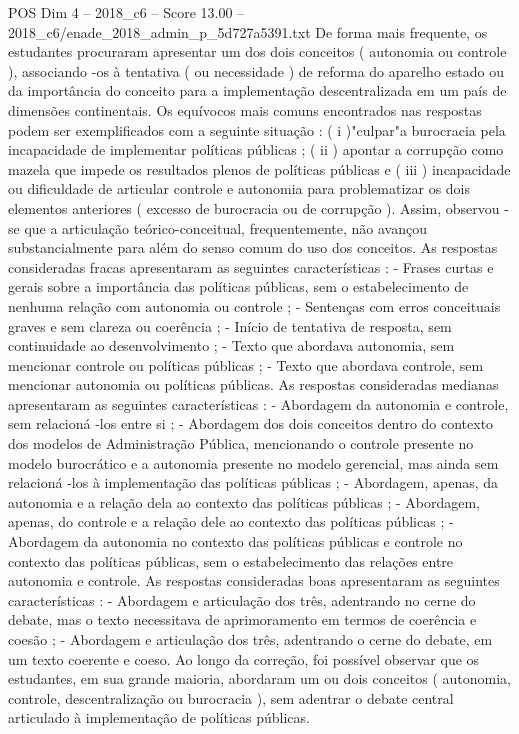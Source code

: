 \begin{textsample}{POS Dim 4 – 2018\_c6 – Score 13.00 – 2018\_c6/enade\_2018\_admin\_p\_5d727a5391.txt}
De forma mais frequente, os estudantes procuraram apresentar um dos dois conceitos ( autonomia ou controle ), associando -os à tentativa ( ou necessidade ) de reforma do aparelho estado ou da importância do conceito para a implementação descentralizada em um país de dimensões continentais.
Os equívocos mais comuns encontrados nas respostas podem ser exemplificados com a seguinte situação : ( i )"culpar"a burocracia pela incapacidade de implementar políticas públicas ; ( ii ) apontar a corrupção como mazela que impede os resultados plenos de políticas públicas e ( iii ) incapacidade ou dificuldade de articular controle e autonomia para problematizar os dois elementos anteriores ( excesso de burocracia ou de corrupção ).
Assim, observou -se que a articulação teórico-conceitual, frequentemente, não avançou substancialmente para além do senso comum do uso dos conceitos.
As respostas consideradas fracas apresentaram as seguintes características : - Frases curtas e gerais sobre a importância das políticas públicas, sem o estabelecimento de nenhuma relação com autonomia ou controle ; - Sentenças com erros conceituais graves e sem clareza ou coerência ; - Início de tentativa de resposta, sem continuidade ao desenvolvimento ; - Texto que abordava autonomia, sem mencionar controle ou políticas públicas ; - Texto que abordava controle, sem mencionar autonomia ou políticas públicas.
As respostas consideradas medianas apresentaram as seguintes características : - Abordagem da autonomia e controle, sem relacioná -los entre si ; - Abordagem dos dois conceitos dentro do contexto dos modelos de Administração Pública, mencionando o controle presente no modelo burocrático e a autonomia presente no modelo gerencial, mas ainda sem relacioná -los à implementação das políticas públicas ; - Abordagem, apenas, da autonomia e a relação dela ao contexto das políticas públicas ; - Abordagem, apenas, do controle e a relação dele ao contexto das políticas públicas ; - Abordagem da autonomia no contexto das políticas públicas e controle no contexto das políticas públicas, sem o estabelecimento das relações entre autonomia e controle.
As respostas consideradas boas apresentaram as seguintes características : - Abordagem e articulação dos três, adentrando no cerne do debate, mas o texto necessitava de aprimoramento em termos de coerência e coesão ; - Abordagem e articulação dos três, adentrando o cerne do debate, em um texto coerente e coeso.
Ao longo da correção, foi possível observar que os estudantes, em sua grande maioria, abordaram um ou dois conceitos ( autonomia, controle, descentralização ou burocracia ), sem adentrar o debate central articulado à implementação de políticas públicas.

\end{textsample}

